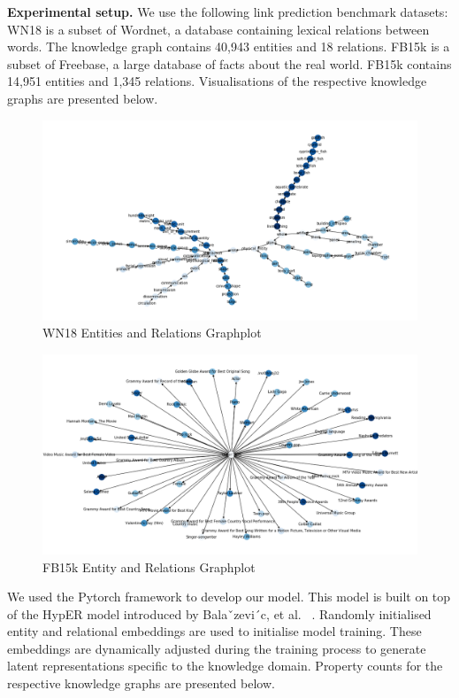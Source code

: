 \noindent \textbf{Experimental setup.} We use the following link prediction benchmark datasets: WN18 \citep{bordes2013translating} is a subset of Wordnet, a database containing lexical relations between words. The knowledge graph contains 40,943 entities and 18 relations. FB15k \citep{bordes2013translating} is a subset of Freebase, a large database of facts about the real world. FB15k contains 14,951 entities and 1,345 relations. Visualisations of the respective knowledge graphs are presented below.

\bigskip

\begin{figure}[H]
   	\centering
    	\includegraphics[width=\textwidth]{WN18_Graph}
	\caption{WN18 Entities and Relations Graphplot}
\end{figure}

\begin{figure}[H]
   	\centering
    	\includegraphics[width=\textwidth]{FB15k_Graph}
	\caption{FB15k Entity and Relations Graphplot}
\end{figure}

\noindent We used the Pytorch framework to develop our model. This model is built on top of the HypER model introduced by Balaˇzevi´c, et al. ~\citep{balazevic2019hypernetwork}. Randomly initialised entity and relational embeddings are used to initialise model training. These embeddings are dynamically adjusted during the training process to generate latent representations specific to the knowledge domain. Property counts for the respective knowledge graphs are presented below.

